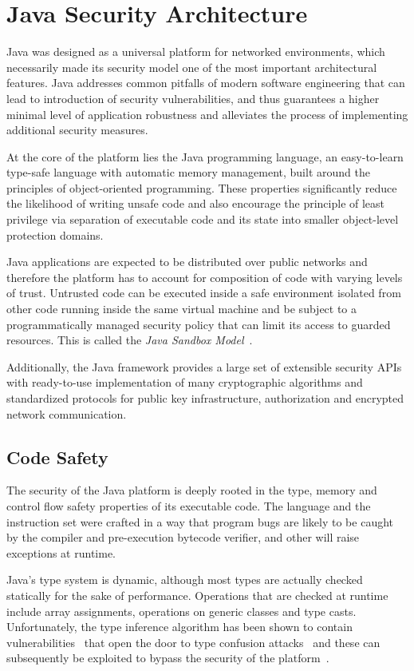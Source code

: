 \documentclass[a4paper,12pt,twoside,openright]{report}
\begin{document}
\section{Java Security Architecture}

Java was designed as a universal platform for networked environments, which necessarily made its security model one of the most important architectural features. Java addresses common pitfalls of modern software engineering that can lead to introduction of security vulnerabilities, and thus guarantees a higher minimal level of application robustness and alleviates the process of implementing additional security measures.

At the core of the platform lies the Java programming language, an easy-to-learn type-safe language with automatic memory management, built around the principles of object-oriented programming. These properties significantly reduce the likelihood of writing unsafe code and also encourage the principle of least privilege via separation of executable code and its state into smaller object-level protection domains.

Java applications are expected to be distributed over public networks and therefore the platform has to account for composition of code with varying levels of trust. Untrusted code can be executed inside a safe environment isolated from other code running inside the same virtual machine and be subject to a programmatically managed security policy that can limit its access to guarded resources. This is called the \emph{Java Sandbox Model}~\cite{Gong:1997:GBS:1267279.1267289}.

Additionally, the Java framework provides a large set of extensible security APIs with ready-to-use implementation of many cryptographic algorithms and standardized protocols for public key infrastructure, authorization and encrypted network communication. 

\subsection{Code Safety}

The security of the Java platform is deeply rooted in the type, memory and control flow safety properties of its executable code. The language and the instruction set were crafted in a way that program bugs are likely to be caught by the compiler and pre-execution bytecode verifier, and other will raise exceptions at runtime. 

\label{section:TypeConfusion}
Java's type system is dynamic, although most types are actually checked statically for the sake of performance. Operations that are checked at runtime include array assignments, operations on generic classes and type casts. Unfortunately, the type inference algorithm has been shown to contain vulnerabilities~\cite{Suenaga:2012:JavaVulnerability} that open the door to type confusion attacks~\cite{Oh:2012:JavaExploitReport} and these can subsequently be exploited to bypass the security of the platform~\cite{McGraw:1999:SJG:298616}.
\end{document}
